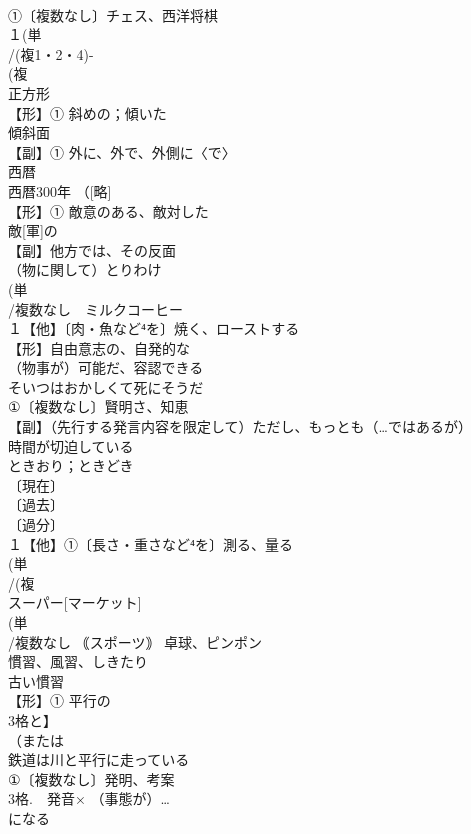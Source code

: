 \documentclass[8pt]{extreport}
\begin{document}
\begin{CJK}{UTF8}{min}
\\	①〔複数なし〕チェス、西洋将棋 
\\	１(単
\\	/(複1・2・4)-
\\	(複
\\	正方形 
\\	【形】① 斜めの；傾いた 
\\	傾斜面
\\	【副】① 外に、外で、外側に〈で〉 
\\	西暦 
\\	西暦300年 （[略]
\\	【形】① 敵意のある、敵対した 
\\	敵[軍]の
\\	【副】他方では、その反面
\\	（物に関して）とりわけ
\\	(単
\\	/複数なし　ミルクコーヒー 
\\	１【他】〔肉・魚など⁴を〕焼く、ローストする 
\\	【形】自由意志の、自発的な
\\	（物事が）可能だ、容認できる
\\	そいつはおかしくて死にそうだ
\\	①〔複数なし〕賢明さ、知恵 
\\	【副】（先行する発言内容を限定して）ただし、もっとも（…ではあるが）
\\	時間が切迫している
\\	ときおり；ときどき
\\	〔現在〕
\\	〔過去〕
\\	〔過分〕
\\	１【他】①〔長さ・重さなど⁴を〕測る、量る 
\\	(単
\\	/(複
\\	スーパー[マーケット] 
\\	(単
\\	/複数なし ｟スポーツ｠ 卓球、ピンポン 
\\	慣習、風習、しきたり 
\\	古い慣習
\\	【形】① 平行の　
\\	3格と】
\\	（または
\\	鉄道は川と平行に走っている
\\	①〔複数なし〕発明、考案 
\\	3格.　発音×	（事態が）…
\\	になる

\end{CJK}
\end{document}

